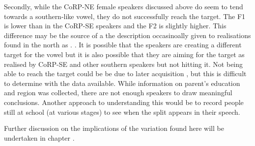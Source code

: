 \documentclass[../../../00.FullDoc/tex/ThesisSkeleton-draft2]{subfiles}
\begin{document}
Secondly, while the CoRP-NE female speakers discussed above do seem to tend towards a southern-like \strutt{} vowel, they do not successfully reach the target. The F1 is lower than in the CoRP-SE speakers and the F2 is slightly higher. This difference may be the source of a the description occasinoally given to \strutt{} realisations found in the north as  \citep{Braber2015,Jansen2020}. . It is possible that the speakers are creating a different target for the \strutt{} vowel but it is also possible that they are aiming for the target as realised by CoRP-SE and other southern speakers but not hitting it. Not being able to reach the target could be be due to later acquisition \citep{Evans2007} , but this is difficult to determine with the data available. While information on parent's education and region was collected, there are not enough speakers to draw meaningful conclusions. Another approach to understanding this would be to record people still at school (at various stages) to see when the \FS{} split appears in their speech.

Further discussion on the implications of the variation found here will be undertaken in chapter \notinsubfile{\ref{ch:Discussion}}.




\onlyinsubfile{
	\pagebreak
	\listoftodos{}
	\pagebreak
	
			
\appendix
\section{} \label{app:STSEF2}


			}
\end{document}
